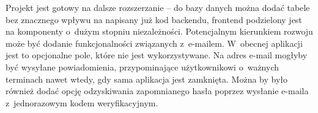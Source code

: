 \documentclass[a4paper,twoside,12pt]{book}
\begin{document}
Projekt jest gotowy na dalsze rozszerzanie -- do bazy danych można dodać tabele bez znacznego wpływu na napisany już kod backendu, frontend podzielony jest na komponenty o~dużym stopniu niezależności. Potencjalnym kierunkiem rozwoju może być dodanie funkcjonalności związanych z~e-mailem. W~obecnej aplikacji jest to opcjonalne pole, które nie jest wykorzystywane. Na adres e-mail mogłyby być wysyłane powiadomienia, przypominające użytkownikowi o~ważnych terminach nawet wtedy, gdy sama aplikacja jest zamknięta. Można by było również dodać opcję odzyskiwania zapomnianego hasła poprzez wysłanie e-maila z~jednorazowym kodem weryfikacyjnym.


\backmatter

\nocite{bib:devmozilla,bib:manytomanyextracolumn}
\printbibliography           %
\end{document}
